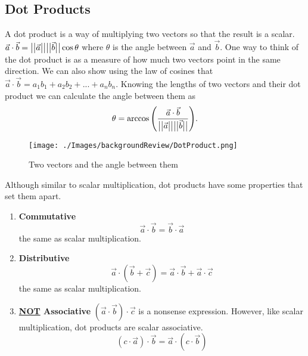 \subsection{Dot Products}
\noindent
A dot product is a way of multiplying two vectors so that the result is a scalar.
$\vec{a}\cdot\vec{b} = \big\lvert \big\lvert \vec{a} \big\rvert \big\rvert\big\lvert \big\lvert \vec{b} \big\rvert \big\rvert\cos{\theta}$ where $\theta$ is the angle between $\vec{a}$ and $\vec{b}$.
One way to think of the dot product is as a measure of how much two vectors point in the same direction.
We can also show using the law of cosines that $\vec{a}\cdot\vec{b} = a_1b_1+a_2b_2+...+a_nb_n$.
Knowing the lengths of two vectors and their dot product we can calculate the angle between them as
\begin{equation*}
	\theta = \arccos{\left(\frac{\vec{a} \cdot \vec{b}}{\big\lvert \big\lvert \vec{a} \big\rvert \big\rvert \big\lvert \big\lvert \vec{b} \big\rvert \big\rvert}\right)}.
\end{equation*}

\begin{figure}[H]
	\centering
	\texttt{[image: ./Images/backgroundReview/DotProduct.png]}
	\caption{Two vectors and the angle between them}
\end{figure}

\noindent
Although similar to scalar multiplication, dot products have some properties that set them apart.
\begin{enumerate}[label=]
	\item \textbf{Commutative}
		\begin{equation*}
			\vec{a}\cdot\vec{b} = \vec{b}\cdot\vec{a}
		\end{equation*}
		the same as scalar multiplication.
	\item \textbf{Distributive}
		\begin{equation*}
			\vec{a}\cdot\left(\vec{b}+\vec{c}\right) = \vec{a}\cdot\vec{b}+\vec{a}\cdot\vec{c}
		\end{equation*}
		the same as scalar multiplication.
	\item \textbf{\underline{NOT} Associative}
		$\left(\vec{a}\cdot\vec{b}\right)\cdot\vec{c}$ is a nonsense expression.
		However, like scalar multiplication, dot products are scalar associative.
		\begin{equation*}
			\left(c\cdot\vec{a}\right)\cdot\vec{b} = \vec{a}\cdot\left(c\cdot\vec{b}\right)
		\end{equation*}
\end{enumerate}